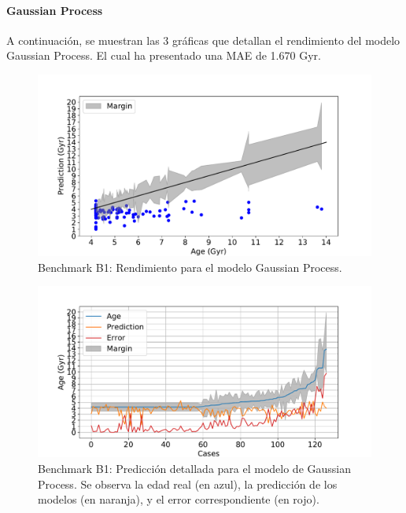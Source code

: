 \paragraph{Gaussian Process} 
A continuación, se muestran las 3 gráficas que detallan el rendimiento del modelo Gaussian Process. El cual ha presentado una MAE de 1.670 Gyr.
\begin{figure}[H]
\begin{center}
 \includegraphics[width=0.8\linewidth]{Figuras/Experimentos/B_B1_gp_1.pdf}
\end{center}
\caption{Benchmark B1: Rendimiento para el modelo Gaussian Process.}
 \label{fig:benchB1_details_gp_1}
\end{figure}

\begin{figure}[H]
\begin{center}
 \includegraphics[width=0.8\linewidth]{Figuras/Experimentos/B_B1_gp_2.pdf}
\end{center}
\caption{Benchmark B1: Predicción detallada para el modelo de Gaussian Process. Se observa la edad real (en azul), la predicción de los modelos (en naranja), y el error correspondiente (en rojo).}
 \label{fig:benchB1_details_gp_2}
\end{figure}

